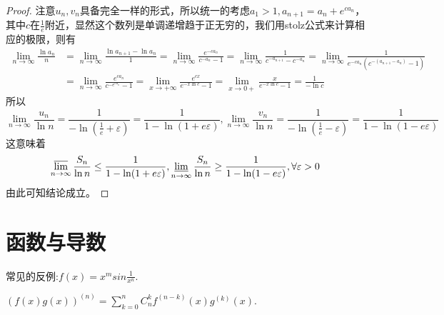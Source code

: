 \documentclass[../../main.tex]{subfiles}
\begin{document}
\begin{proof}
注意\(u_n,v_n\)具备完全一样的形式，所以统一的考虑\(a_1>1,a_{n + 1}=a_n + e^{ca_n}\)，其中\(c\)在\(\frac{1}{e}\)附近，显然这个数列是单调递增趋于正无穷的，我们用stolz公式来计算相应的极限，则有
\begin{align*}
\lim_{n\rightarrow\infty}\frac{\ln a_n}{n}&=\lim_{n\rightarrow\infty}\frac{\ln a_{n + 1}-\ln a_n}{1}=\lim_{n\rightarrow\infty}\frac{e^{-ca_n}}{c^{-a_n}-1}=\lim_{n\rightarrow\infty}\frac{1}{c^{-a_{n + 1}}-c^{-a_n}}=\lim_{n\rightarrow\infty}\frac{1}{e^{-ca_n}(c^{-(a_{n + 1}-a_n)}-1)}\\
&=\lim_{n\rightarrow\infty}\frac{e^{ca_n}}{c^{-e^{ca_n}}-1}=\lim_{x\rightarrow+\infty}\frac{e^{cx}}{e^{-x\ln c}-1}=\lim_{x\rightarrow0+}\frac{x}{e^{-x\ln c}-1}=\frac{1}{-\ln c}
\end{align*}
所以
\[\lim_{n\rightarrow\infty}\frac{u_n}{\ln n}=\frac{1}{-\ln(\frac{1}{e}+\varepsilon)}=\frac{1}{1-\ln(1 + e\varepsilon)},\lim_{n\rightarrow\infty}\frac{v_n}{\ln n}=\frac{1}{-\ln(\frac{1}{e}-\varepsilon)}=\frac{1}{1-\ln(1 - e\varepsilon)}\]
这意味着
\[\varlimsup_{n\rightarrow\infty}\frac{S_n}{\ln n}\leq\frac{1}{1-\ln(1 + e\varepsilon)},\varliminf_{n\rightarrow\infty}\frac{S_n}{\ln n}\geq\frac{1}{1-\ln(1 - e\varepsilon)},\forall\varepsilon>0\]
由此可知结论成立。
\end{proof}







\chapter{函数与导数}

常见的反例:$f(x)=x^msin\frac{1}{x^n}.$

\begin{theorem}[Leibniz公式]\label{theorem:Leibniz公式}
$(f(x)g(x))^{(n)} = \sum_{k = 0}^{n} C_{n}^{k}f^{(n - k)}(x)g^{(k)}(x).$
\end{theorem}
\end{document}
